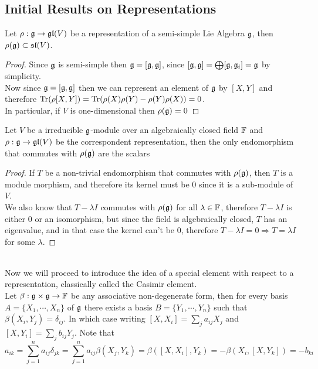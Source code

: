 \subsection*{Initial Results on Representations}
\begin{lema}
	Let $\rho:\mathfrak{g}\rightarrow \mathfrak{gl}(V)$ be a representation of a semi-simple Lie Algebra $\mathfrak{g}$, then $\rho(\mathfrak{g})\subset \mathfrak{sl}(V)$.
	\label{trace0lemma}
\end{lema}
\begin{proof}
	Since $\mathfrak{g}$ is semi-simple then $\mathfrak{g}=[\mathfrak{g},\mathfrak{g}]$, since $[\mathfrak{g},\mathfrak{g}] = \bigoplus [\mathfrak{g},\mathfrak{g}_i] = \mathfrak{g}$ by simplicity.\\ 
	Now since $\mathfrak{g}=[\mathfrak{g},\mathfrak{g}]$ then we can represent an element of $\mathfrak{g}$ by $[X,Y]$ and therefore $\text{Tr}(\rho[X,Y]) = \text{Tr}(\rho(X)\rho(Y)-\rho(Y)\rho(X))=0$.\\
	In particular, if $V$ is one-dimensional then $\rho(\mathfrak{g}) = 0$
\end{proof}
\begin{lema}
	Let $V$ be a irreducible $\mathfrak{g}$-module over an algebraically closed field $\mathbb{F}$ and $\rho:\mathfrak{g} \rightarrow \mathfrak{gl}(V)$ be the correspondent representation, then the only endomorphism that commutes with $\rho(\mathfrak{g})$ are the scalars
	\label{Schur's Lemma}
\end{lema}
\begin{proof}
	If $T$ be a non-trivial endomorphism that commutes with $\rho(\mathfrak{g})$, then $T$ is a module morphism, and therefore its kernel must be $0$ since it is a sub-module of $V$.\\
	We also know that $T - \lambda I$ commutes with $\rho(\mathfrak{g})$ for all $\lambda \in \mathbb{F}$, therefore $T-\lambda I$ is either $0$ or an isomorphism, but since the field is algebraically closed, $T$ has an eigenvalue, and in that case the kernel can't be $0$, therefore $T-\lambda I = 0 \Rightarrow T=\lambda I$ for some $\lambda$.
\end{proof}\\
Now we will proceed to introduce the idea of a special element with respect to a representation, classically called the Casimir element.\\
Let $\beta:\mathfrak{g} \times \mathfrak{g} \rightarrow \mathbb{F}$ be any associative non-degenerate form, then for every basis $A=\{X_1,\cdots,X_n\}$ of $\mathfrak{g}$ there exists a basis $B=\{Y_1,\cdots,Y_n\}$ such that $\beta(X_i,Y_j)=\delta_{ij}$. In which case writing $[X,X_i] = \sum_j a_{ij} X_j$ and $[X,Y_i]=\sum_j b_{ij} Y_j$. Note that
$$a_{ik} = \sum_{j=1}^n a_{ij}\delta_{jk} = \sum_{j=1}^n a_{ij} \beta(X_j,Y_k) =\beta([X,X_i],Y_k) = -\beta (X_i,[X,Y_k]) = -b_{ki} $$
